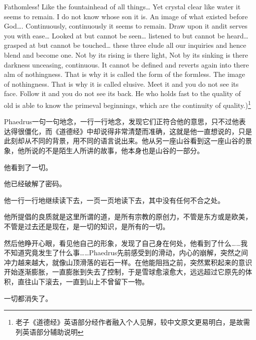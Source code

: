 \documentclass[UTF8]{article}
\begin{document}
\par Fathomless! Like the fountainhead of all things… Yet crystal clear like water it seems to remain. I do not know whose son it is. An image of what existed before God…. Continuously, continuously it seems to remain. Draw upon it andit serves you with ease… Looked at but cannot be seen… listened to but cannot be heard… grasped at but cannot be touched… these three elude all our inquiries and hence blend and become one. Not by its rising is there light, Not by its sinking is there darkness unceasing, continuous. It cannot be defined and reverts again into there alm of nothingness. That is why it is called the form of the formless. The image of nothingness. That is why it is called elusive. Meet it and you do not see its face. Follow it and you do not see its back. He who holds fast to the quality of old is able to know the primeval beginnings, which are the continuity of quality.)\footnote{老子《道德经》英语部分经作者融入个人见解，较中文原文更易明白，是故需列英语部分辅助说明}
\par Phaedrus一句一句地念，一行一行地念，发现它们正符合他的意思，只不过他表达得很僵化，而《道德经》中却说得非常清楚而准确，这就是他一直想说的，只是此刻却从不同的背景，用不同的语言说出来。他从另一座山谷看到这一座山谷的景象，他所说的不是陌生人所讲的故事，他本身也是山谷的一部分。
\par 他看到了一切。
\par 他已经破解了密码。
\par 他一行一行地继续读下去，一页一页地读下去，其中没有任何不合之处。
\par 他所提倡的良质就是这里所谓的道，是所有宗教的原创力，不管是东方或是欧美，不管是过去还是现在，是一切的知识，是所有的一切。
\par 然后他睁开心眼，看见他自己的形象，发现了自己身在何处，他看到了什么……我不知道究竟发生了什么事……Phaedrus先前感受到的滑动，内心的崩解，突然之间冲力越来越大，就像山顶滑落的岩石一样。在他能阻挡之前，突然累积起来的意识开始逐渐膨胀，一直膨胀到失去了控制，于是雪球愈滚愈大，远远超过它原先的体积，直往山下滚去，一直到山上不曾留下一物。
\par 一切都消失了。
\end{document}
